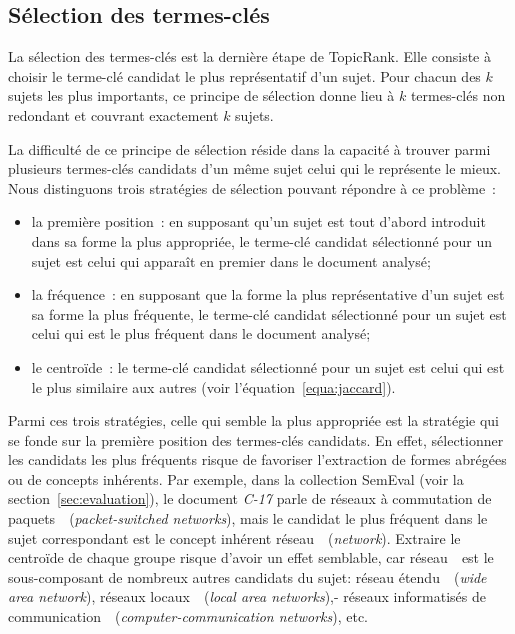   \subsection{Sélection des termes-clés}
  \label{subsec:selection_des_termes_cles}
    La sélection des termes-clés est la dernière étape de TopicRank. Elle
    consiste à choisir le terme-clé candidat le plus représentatif d'un sujet.
    Pour chacun des $k$ sujets les plus importants, ce principe de sélection
    donne lieu à $k$ termes-clés non redondant et couvrant exactement $k$
    sujets.

    La difficulté de ce principe de sélection réside dans la capacité à trouver
    parmi plusieurs termes-clés candidats d'un même sujet celui qui le
    représente le mieux. Nous distinguons trois stratégies de sélection pouvant
    répondre à ce problème~:
    \begin{itemize}
      \item{la première position~: en supposant qu'un sujet est tout d'abord
            introduit dans sa forme la plus appropriée, le terme-clé candidat
            sélectionné pour un sujet est celui qui apparaît en premier dans le
            document analysé;}
      \item{la fréquence~: en supposant que la forme la plus représentative d'un
            sujet est sa forme la plus fréquente, le terme-clé candidat
            sélectionné pour un sujet est celui qui est le plus fréquent dans le
            document analysé;}
      \item{le centroïde~: le terme-clé candidat sélectionné pour un sujet est
            celui qui est le plus similaire aux autres (voir
            l'équation~\ref{equa:jaccard}).}
    \end{itemize}
    Parmi ces trois stratégies, celle qui semble la plus appropriée est la
    stratégie qui se fonde sur la première position des termes-clés candidats.
    En effet, sélectionner les candidats les plus fréquents risque de favoriser
    l'extraction de formes abrégées ou de concepts inhérents. Par exemple, dans
    la collection SemEval (voir la section~\ref{sec:evaluation}), le document
    \textit{C-17} parle de \og réseaux à commutation de
    paquets~\fg\ (\textit{packet-switched networks}), mais le candidat le plus
    fréquent dans le sujet correspondant est le concept inhérent
    \og réseau~\fg\ (\textit{network}). Extraire le centroïde de chaque groupe
    risque d'avoir un effet semblable, car \og réseau~\fg\ est le sous-composant
    de nombreux autres candidats du sujet:
    \og réseau étendu~\fg\ (\textit{wide area network}),
    \og réseaux locaux~\fg\ (\textit{local area networks}),-
    \og réseaux informatisés de communication~\fg\ (\textit{computer-communication networks}),
    etc.

